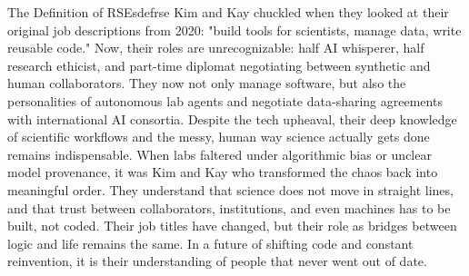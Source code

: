 \documentclass{eceasst}
\begin{document}
\begin{story}{The Definition of RSEs}{defrse}
Kim and Kay chuckled when they looked at their original job descriptions from 2020: "build tools for scientists, manage data, write reusable code."
Now, their roles are unrecognizable: half AI whisperer, half research ethicist, and part-time diplomat negotiating between synthetic and human collaborators.
They now not only manage software, but also the personalities of autonomous lab agents and negotiate data-sharing agreements with international AI consortia.
Despite the tech upheaval, their deep knowledge of scientific workflows and the messy, human way science actually gets done remains indispensable.
When labs faltered under algorithmic bias or unclear model provenance, it was Kim and Kay who transformed the chaos back into meaningful order.
They understand that science does not move in straight lines, and that trust between collaborators, institutions, and even machines has to be built, not coded.
Their job titles have changed, but their role as bridges between logic and life remains the same.
In a future of shifting code and constant reinvention, it is their understanding of people that never went out of date.

\end{story}
\end{document}
